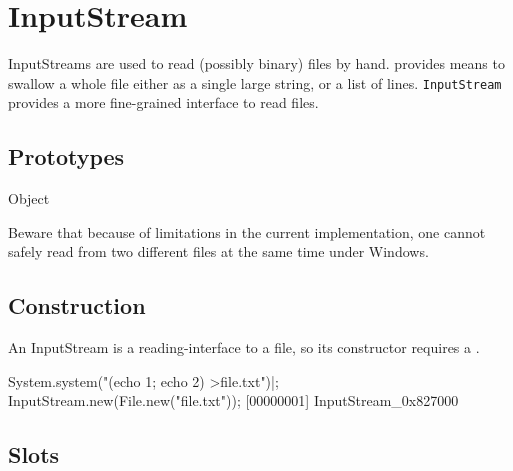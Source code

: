 \section{InputStream}

InputStreams are used to read (possibly binary) files by hand.
 provides means to swallow a whole file either as a
single large string, or a list of lines.  \lstinline|InputStream|
provides a more fine-grained interface to read files.

\subsection{Prototypes}
\begin{refObjects}
\item[Object]
\end{refObjects}

\begin{windows}
  Beware that because of limitations in the current implementation,
  one cannot safely read from two different files at the same time
  under Windows.
\end{windows}

\subsection{Construction}

An InputStream is a reading-interface to a file, so its constructor
requires a .

\begin{urbiscript}[firstnumber=1]
System.system("(echo 1; echo 2) >file.txt")|;
InputStream.new(File.new("file.txt"));
[00000001] InputStream_0x827000
\end{urbiscript}

\subsection{Slots}

